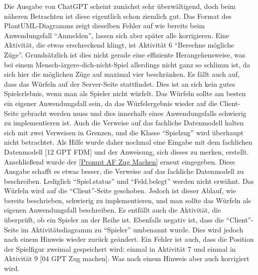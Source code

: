 Die Ausgabe von ChatGPT scheint zunächst sehr überwältigend, doch beim näheren Betrachten ist diese eigentlich schon ziemlich gut. Das 
Format des PlantUML-Diagramms zeigt dieselben Fehler auf wie bereits beim Anwendungsfall ``Anmelden'', lassen sich aber später alle 
korrigieren. Eine Aktivität, die etwas erschreckend klingt, ist Aktivität 6 ``Berechne mögliche Züge''. Grundsätzlich ist dies nicht 
gerade eine effiziente Herangehensweise, was bei einem Mensch-ärgere-dich-nicht-Spiel allerdings nicht ganz so schlimm ist, da sich 
hier die möglichen Züge auf maximal vier beschränken. Es fällt auch auf, dass das Würfeln auf der Server-Seite stattfindet. Dies ist 
an sich kein gutes Spielerlebnis, wenn man als Spieler nicht würfelt. Das Würfeln sollte am besten ein eigener Anwendungsfall sein, da 
das Würfelergebnis wieder auf die Client-Seite gebracht werden muss und dies innerhalb eines Anwendungsfalls schwierig zu implementieren 
ist. Auch die Verweise auf das fachliche Datenmodell halten sich mit zwei Verweisen in Grenzen, und die Klasse ``Spielzug'' wird überhaupt 
nicht betrachtet. Als Hilfe wurde daher nochmal eine Eingabe mit dem fachlichen Datenmodell [12 GPT FDM] und der Anweisung, sich dieses 
zu merken, erstellt. Anschließend wurde der \autoref{Prompt AF Zug Machen} erneut eingegeben. Diese Ausgabe schafft es etwas besser, 
die Verweise auf das fachliche Datenmodell zu beschreiben. Lediglich ``Spiel.status'' und ``Feld.belegt'' werden nicht erwähnt. Das Würfeln 
wird auf die ``Client''-Seite geschoben. Jedoch ist dieser Ablauf, wie bereits beschrieben, schwierig zu implementieren, und man sollte das 
Würfeln als eigenen Anwendungsfall beschreiben. Es entfällt auch die Aktivität, die überprüft, ob ein Spieler an der Reihe ist. Ebenfalls 
negativ ist, dass die ``Client''-Seite im Aktivitätsdiagramm zu ``Spieler'' umbenannt wurde. Dies wird jedoch nach einem Hinweis wieder zurück 
geändert. Ein Fehler ist auch, dass die Position der Spielfigur zweimal gespeichert wird: einmal in Aktivität 7 und einmal in Aktivität 9 
[04 GPT Zug machen]. Was nach einem Hinweis aber auch korrigiert wird.

